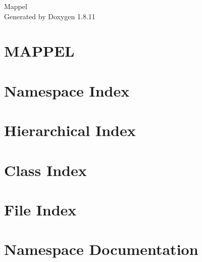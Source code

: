\documentclass[twoside]{article}
\newcommand{\+}{\discretionary{\mbox{\scriptsize$\hookleftarrow$}}{}{}}
\begin{document}
\hypersetup{pageanchor=false,
             bookmarksnumbered=true,
             pdfencoding=unicode
            }
\begin{titlepage}
\vspace*{7cm}
\begin{center}%
{\Large Mappel }\\
\vspace*{1cm}
{\large Generated by Doxygen 1.8.11}\\
\end{center}
\end{titlepage}
\tableofcontents
{}
\hypersetup{pageanchor=true}

\section{M\+A\+P\+P\+EL}
\label{index}\hypertarget{index}{}
\section{Namespace Index}

\section{Hierarchical Index}

\section{Class Index}

\section{File Index}

\section{Namespace Documentation}










\end{document}
